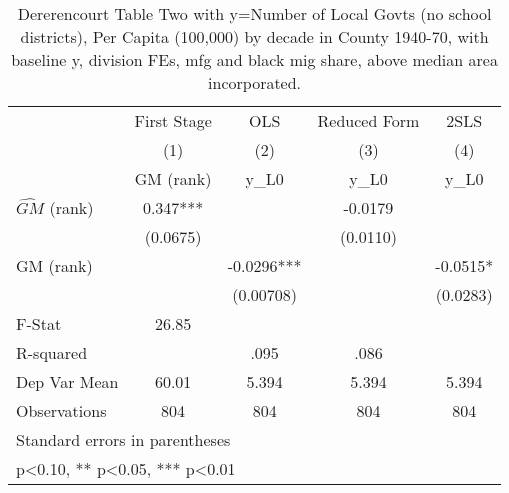 \begin{table}[htbp]\centering
\def\sym#1{\ifmmode^{#1}\else\(^{#1}\)\fi}
\caption{Dererencourt Table Two with y=Number of Local Govts (no school districts), Per Capita (100,000) by decade in County 1940-70, with baseline y, division FEs, mfg and black mig share, above median area incorporated.}
\begin{tabular}{l*{4}{c}}
\toprule
                    & First Stage   &         OLS   &Reduced Form   &        2SLS   \\
                    &\multicolumn{1}{c}{(1)}&\multicolumn{1}{c}{(2)}&\multicolumn{1}{c}{(3)}&\multicolumn{1}{c}{(4)}\\
                    &\multicolumn{1}{c}{GM  (rank)}&\multicolumn{1}{c}{y\_L0}&\multicolumn{1}{c}{y\_L0}&\multicolumn{1}{c}{y\_L0}\\
\midrule
$\hat{GM}$ (rank)   &       0.347***&               &     -0.0179   &               \\
                    &    (0.0675)   &               &    (0.0110)   &               \\
\addlinespace
GM  (rank)          &               &     -0.0296***&               &     -0.0515*  \\
                    &               &   (0.00708)   &               &    (0.0283)   \\
\midrule
F-Stat              &       26.85   &               &               &               \\
R-squared           &               &        .095   &        .086   &               \\
Dep Var Mean        &       60.01   &       5.394   &       5.394   &       5.394   \\
Observations        &         804   &         804   &         804   &         804   \\
\bottomrule
\multicolumn{5}{l}{\footnotesize Standard errors in parentheses}\\
\multicolumn{5}{l}{\footnotesize * p<0.10, ** p<0.05, *** p<0.01}\\
\end{tabular}
\end{table}

